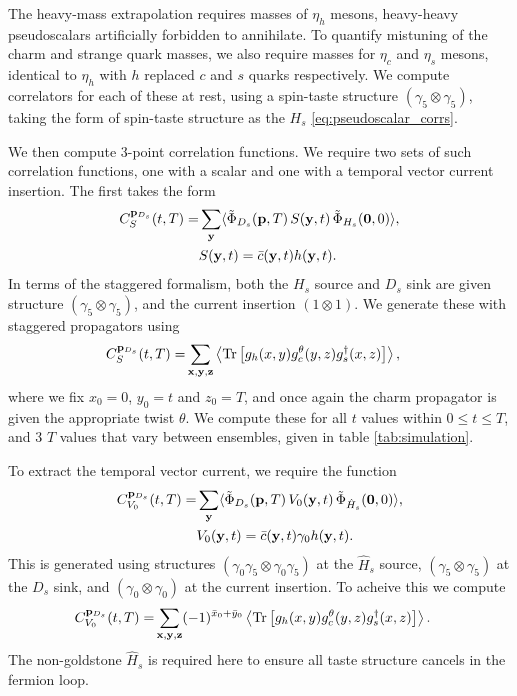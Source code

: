 The heavy-mass extrapolation requires masses of $\eta_h$ mesons, heavy-heavy pseudoscalars artificially forbidden to annihilate. To quantify mistuning of the charm and strange quark masses, we also require masses for $\eta_c$ and $\eta_s$ mesons, identical to $\eta_h$ with $h$ replaced $c$ and $s$ quarks respectively. We compute correlators for each of these at rest, using a spin-taste structure $(\gamma_5\otimes \gamma_5)$, taking the form of spin-taste structure as the $H_s$ \eqref{eq:pseudoscalar_corrs}.

We then compute 3-point correlation functions. We require two sets of such correlation functions, one with a scalar and one with a temporal vector current insertion. The first takes the form
\begin{align}
  C^{{\bf{p}}_{D_s}}_S(t,T) =& \sum_{{\bf{y}}} \langle \tilde{\Phi}_{D_s}({\bf{p}},T)\, S({\bf{y}},t) \,\tilde{\Phi}_{H_s}({\bf{0}},0) \rangle, \\ &S({\bf{y}},t) = \bar{c}({\bf{y}},t) h({\bf{y}},t). \nonumber
\end{align}
In terms of the staggered formalism, both the $H_s$ source and $D_s$ sink are given structure $(\gamma_5\otimes \gamma_5)$, and the current insertion $(1\otimes1)$. We generate these with staggered propagators using
\begin{align}
  C^{{\bf{p}}_{D_s}}_S(t,T) =& \sum_{{\bf{x},\bf{y},\bf{z}}} \left\langle \text{Tr}\left[ g_h(x,y)g^{\theta}_c(y,z) g^{\dagger}_s(x,z) \right] \right\rangle,
\end{align}
where we fix $x_0 = 0$, $y_0=t$ and $z_0=T$, and once again the charm propagator is given the appropriate twist $\theta$. We compute these for all $t$ values within $0\leq t\leq T$, and 3 $T$ values that vary between ensembles, given in table \ref{tab:simulation}.

To extract the temporal vector current, we require the function
\begin{align}
  C^{{\bf{p}}_{D_s}}_{V_0}(t,T) =& \sum_{{\bf{y}}} \langle \tilde{\Phi}_{D_s}({\bf{p}},T)\, V_0({\bf{y}},t) \,\tilde{\Phi}_{\hat{H}_s}({\bf{0}},0) \rangle, \\ &V_0({\bf{y}},t) = \bar{c}({\bf{y}},t) \gamma_0 h({\bf{y}},t). \nonumber
\end{align}
This is generated using structures $(\gamma_0\gamma_5\otimes \gamma_0\gamma_5)$ at the $\hat{H}_s$ source, $(\gamma_5\otimes \gamma_5)$ at the $D_s$ sink, and $(\gamma_0\otimes \gamma_0)$ at the current insertion. To acheive this we compute
\begin{align}
  C^{{\bf{p}}_{D_s}}_{V_0}(t,T) =& \sum_{{\bf{x},\bf{y},\bf{z}}} (-1)^{\bar{x}_0+\bar{y}_0} \left\langle \text{Tr}\left[ g_h(x,y)g^{\theta}_c(y,z) g^{\dagger}_s(x,z) \right] \right\rangle.
\end{align}
The non-goldstone $\hat{H}_s$ is required here to ensure all taste structure cancels in the fermion loop.

